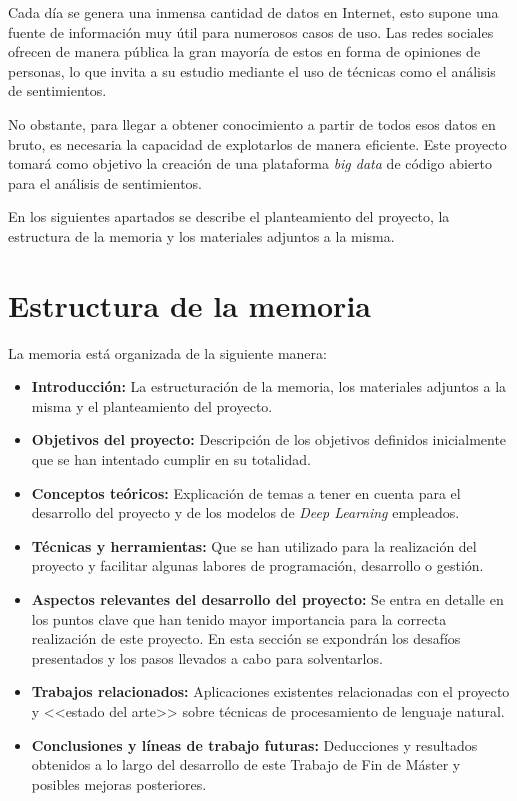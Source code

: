 
Cada día se genera una inmensa cantidad de datos en Internet, esto supone una fuente de información muy útil para numerosos casos de uso. Las redes sociales ofrecen de manera pública la gran mayoría de estos en forma de opiniones de personas, lo que invita a su estudio mediante el uso de técnicas como el análisis de sentimientos.

No obstante, para llegar a obtener conocimiento a partir de todos esos datos en bruto, es necesaria la capacidad de explotarlos de manera eficiente. Este proyecto tomará como objetivo la creación de una plataforma \textit{big data} de código abierto para el análisis de sentimientos. 

En los siguientes apartados se describe el planteamiento del proyecto, la estructura de la memoria y los materiales adjuntos a la misma.

\section{Estructura de la memoria}

La memoria está organizada de la siguiente manera:

\begin{itemize}
    \item \textbf{Introducción:} La estructuración de la memoria, los materiales adjuntos a la misma y el planteamiento del proyecto.
    \item \textbf{Objetivos del proyecto:} Descripción de los objetivos definidos inicialmente que se han intentado cumplir en su totalidad.
    \item \textbf{Conceptos teóricos:} Explicación de temas a tener en cuenta para el desarrollo del proyecto y de los modelos de \textit{Deep Learning} empleados.
    \item \textbf{Técnicas y herramientas:} Que se han utilizado para la realización del proyecto y facilitar algunas labores de programación, desarrollo o gestión.
    \item \textbf{Aspectos relevantes del desarrollo del proyecto:} Se entra en detalle en los puntos clave que han tenido mayor importancia para la correcta realización de este proyecto. En esta sección se expondrán los desafíos presentados y los pasos llevados a cabo para solventarlos.
    \item \textbf{Trabajos relacionados:} Aplicaciones existentes relacionadas con el proyecto y <<estado del arte>> sobre técnicas de procesamiento de lenguaje natural.
    \item \textbf{Conclusiones y líneas de trabajo futuras:} Deducciones y resultados obtenidos a lo largo del desarrollo de este Trabajo de Fin de Máster y posibles mejoras posteriores.
\end{itemize}

